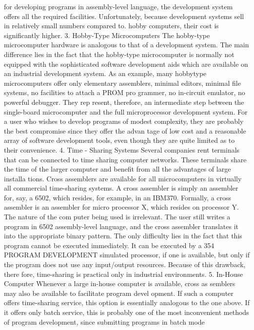 \documentclass{book}
\begin{document}
{{{{{{{{{{{{{{{{{{{{{{{{{{{{{{{{{{{{{{{{{{{{{{{{{{{{{{{{{{{{{{{{{{{{{{{{{{{{{{{{{{{{{{{{{{{{{{{{{{{{{{{{{{{{{{{{{{{{{{{{{{{{{{{{{{{{{{{{{{{{for developing programs in assembly-level language, the development
system offers all the required facilities. Unfortunately, because
development systems sell in relatively small numbers compared to.
hobby computers, their cost is significantly higher.
3. Hobby-Type Microcomputers
The hobby-type microcomputer hardware is analogous to that of a
development system. The main difference lies in the fact that the
hobby-type microcomputer is normally not equipped with the
sophisticated software development aids which are available on
an industrial development system. As an example, many hobbytype
microcomputers offer only elementary assemblers, minimal
editors, minimal file systems, no facilities to attach a PROM pro
grammer, no in-circuit emulator, no powerful debugger. They rep
resent, therefore, an intermediate step between the single-board
microcomputer and the full microprocessor development system.
For a user who wishes to develop programs of modest complexity,
they are probably the best compromise since they offer the advan
tage of low cost and a reasonable array of software development
tools, even though they are quite limited as to their convenience.
4. Time - Sharing Systems
Several companies rent terminals that can be connected to time
sharing computer networks. These terminals share the time of the
larger computer and benefit from all the advantages of large installa
tions. Cross assemblers are available for all microcomputers in
virtually all commercial time-sharing systems. A cross assembler is
simply an assembler for, say, a 6502, which resides, for example, in
an IBM370. Formally, a cross assembler is an assembler for micro
processor X, which resides on processor Y. The nature of the com
puter being used is irrelevant. The user still writes a program in 6502
assembly-level language, and the cross assembler translates it into the
appropriate binary pattern. The only difficulty lies in the fact that this
program cannot be executed immediately. It can be executed by a
354
PROGRAM DEVELOPMENT
simulated processor, if one is available, but only if the program does
not use any input/output resources. Because of this drawback, there
fore, time-sharing is practical only in industrial environments.
5. In-House Computer
Whenever a large in-house computer is available, cross as
semblers may also be available to facilitate program devel
opment. If such a computer offers time-sharing service, this option
is essentially analogous to the one above. If it offers only batch
service, this is probably one of the most inconvenient methods of
program development, since submitting programs in batch mode
}}}}}}}}}}}}}}}}}}}}}}}}}}}}}}}}}}}}}}}}}}}}}}}}}}}}}}}}}}}}}}}}}}}}}}}}}}}}}}}}}}}}}}}}}}}}}}}}}}}}}}}}}}}}}}}}}}}}}}}}}}}}}}}}}}}}}}}}}}}}
\end{document}
